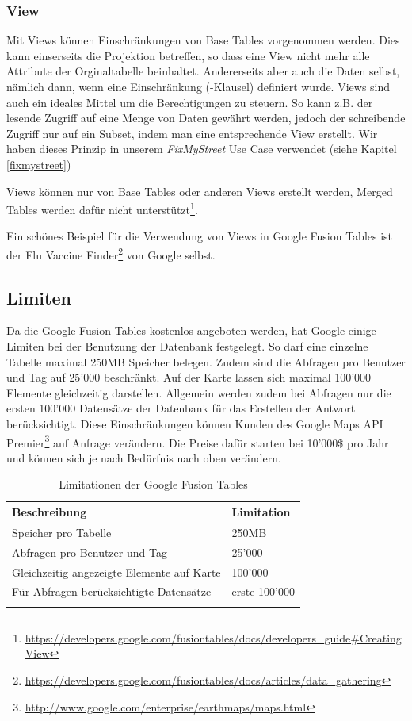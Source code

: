\subsubsection{View}
Mit Views können Einschränkungen von Base Tables vorgenommen werden. Dies kann einserseits die Projektion betreffen, so dass eine View nicht mehr alle Attribute der Orginaltabelle beinhaltet. Andererseits aber auch die Daten selbst, nämlich dann, wenn eine Einschränkung (-Klausel) definiert wurde. Views sind auch ein ideales Mittel um die Berechtigungen zu steuern. So kann z.B. der lesende Zugriff auf eine Menge von Daten gewährt werden, jedoch der schreibende Zugriff nur auf ein Subset, indem man eine entsprechende View erstellt. Wir haben dieses Prinzip in unserem \emph{FixMyStreet} Use Case verwendet (siehe Kapitel \ref{fixmystreet})

Views können nur von Base Tables oder anderen Views erstellt werden, Merged Tables werden dafür nicht unterstützt\footnote{\url{https://developers.google.com/fusiontables/docs/developers_guide\#CreatingView}}.

Ein schönes Beispiel für die Verwendung von Views in Google Fusion Tables ist der Flu Vaccine Finder\footnote{\url{https://developers.google.com/fusiontables/docs/articles/data_gathering}} von Google selbst.

\subsection{Limiten}
Da die Google Fusion Tables kostenlos angeboten werden, hat Google einige Limiten bei der Benutzung der Datenbank festgelegt. So darf eine einzelne Tabelle maximal 250MB Speicher belegen. Zudem sind die Abfragen pro Benutzer und Tag auf 25'000 beschränkt. Auf der Karte lassen sich maximal 100'000 Elemente gleichzeitig darstellen. Allgemein werden zudem bei Abfragen nur die ersten 100'000 Datensätze der Datenbank für das Erstellen der Antwort berücksichtigt. Diese Einschränkungen können Kunden des Google Maps API Premier\footnote{\url{http://www.google.com/enterprise/earthmaps/maps.html}} auf Anfrage verändern. Die Preise dafür starten bei 10'000\$ pro Jahr und können sich je nach Bedürfnis nach oben verändern.\cite{fusion-tables-geo-limits}

\begin{longtable}{|l|l|}
\hline 
\textbf{Beschreibung} & \textbf{Limitation} \\ 
\hline 
Speicher pro Tabelle & 250MB \\ 
\hline 
Abfragen pro Benutzer und Tag & 25'000 \\ 
\hline 
Gleichzeitig angezeigte Elemente auf Karte & 100'000 \\ 
\hline 
Für Abfragen berücksichtigte Datensätze & erste 100'000 \\ 
\hline 
\caption{Limitationen der Google Fusion Tables}
\label{gft-limitations}
\end{longtable} 

